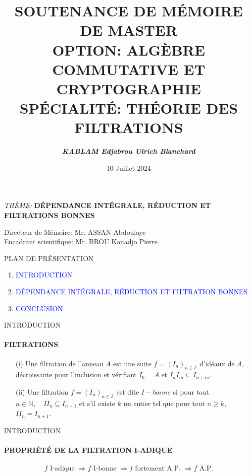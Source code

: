 \documentclass[11pt,a4paper]{beamer}
\author{\textit{\textbf{KABLAM Edjabrou Ulrich Blanchard}}}
\title{\textbf{SOUTENANCE DE MÉMOIRE DE MASTER \\ OPTION: ALGÈBRE COMMUTATIVE ET CRYPTOGRAPHIE\\ SPÉCIALITÉ: THÉORIE DES FILTRATIONS}}
\institute{\textcolor{red}{\textbf{Université NANGUI ABROGOUA \\ UFR Sciences Fondamentales Appliquées}}}
\date{10 Juillet 2024}
\begin{document}
\begin{frame}
\maketitle
\begin{block}{\begin{center}
\emph{THÈME:} \textbf{DÉPENDANCE INTÉGRALE, RÉDUCTION ET FILTRATIONS BONNES }
\end{center}}
\begin{center}
Directeur de Mémoire: Mr. ASSAN Abdoulaye \\
Encadrant scientifique: Mr. BROU Kouadjo Pierre
\end{center}
\end{block}
\end{frame}

\begin{frame}{
PLAN DE PRÉSENTATION}
\begin{enumerate}
\item \textcolor{blue}{INTRODUCTION}\\
\item \textcolor{blue}{DÉPENDANCE INTÉGRALE, RÉDUCTION ET FILTRATION BONNES }\\
\item \textcolor{blue}{CONCLUSION}\\
\end{enumerate}
\end{frame}

\begin{frame}{INTRODUCTION}
\framesubtitle{FILTRATIONS}
\begin{block}{}
	\begin{enumerate}
		\item[(i)] Une filtration de l'anneau $A$ est une suite $f=(I_n)_{n \in \mathbb{Z}}$ d'idéaux de $A$, décroissante pour l'inclusion et vérifiant $I_0 = A$ et $I_n I_m \subseteq I_{n+m}$.
		\item[(ii)] Une filtration $f=(I_n)_{n \in \mathbb{Z}}$ est dite $I-bonne$ si pour tout $n \in \mathbb{N}, \quad II_n \subseteq I_{n+1}$ et s'il existe $k$ un entier tel que pour tout $n \geqslant k$, $II_n = I_{n+1}$.	
	\end{enumerate}
\end{block}
\end{frame}

\begin{frame}{INTRODUCTION}
	\framesubtitle{PROPRIÉTÉ DE LA FILTRATION I-ADIQUE}
	\begin{block}{}
\begin{eqnarray*}
	f \text{ I-adique } \Longrightarrow  f \text{ I-bonne } \Longrightarrow  f \text{ fortement A.P. } \Longrightarrow f \text{ A.P.} \\
\end{eqnarray*}
	\end{block}
\end{frame}
\end{document}
